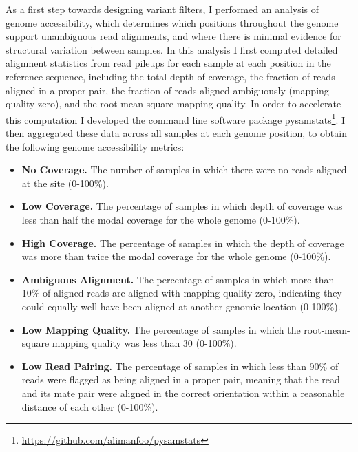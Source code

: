 \documentclass[a4paper,11pt,abstracton,hidelinks]{scrartcl}
\begin{document}
As a first step towards designing variant filters, I performed an analysis of genome accessibility, which determines which positions throughout the genome support unambiguous read alignments, and where there is minimal evidence for structural variation between samples. 
%
In this analysis I first computed detailed alignment statistics from read pileups for each sample at each position in the reference sequence, including the total depth of coverage, the fraction of reads aligned in a proper pair, the fraction of reads aligned ambiguously (mapping quality zero), and the root-mean-square mapping quality.
%
In order to accelerate this computation I developed the command line software package pysamstats\footnote{\url{https://github.com/alimanfoo/pysamstats}}.
%
I then aggregated these data across all samples at each genome position, to obtain the following genome accessibility metrics:
%
\begin{itemize}
%
\item \textbf{No Coverage.} The number of samples in which there were no reads aligned at the site (0-100\%).
%
\item \textbf{Low Coverage.} The percentage of samples in which depth of coverage was less than half the modal coverage for the whole genome (0-100\%).
%
\item \textbf{High Coverage.} The percentage of samples in which the depth of coverage was more than twice the modal coverage for the whole genome (0-100\%).
%
\item \textbf{Ambiguous Alignment.} The percentage of samples in which more than 10\% of aligned reads are aligned with mapping quality zero, indicating they could equally well have been aligned at another genomic location (0-100\%).
%
\item \textbf{Low Mapping Quality.} The percentage of samples in which the root-mean-square mapping quality was less than 30 (0-100\%).
%  
\item \textbf{Low Read Pairing.} The percentage of samples in which less than 90\% of reads were flagged as being aligned in a proper pair, meaning that the read and its mate pair were aligned in the correct orientation within a reasonable distance of each other (0-100\%).
\end{itemize}
\end{document}

